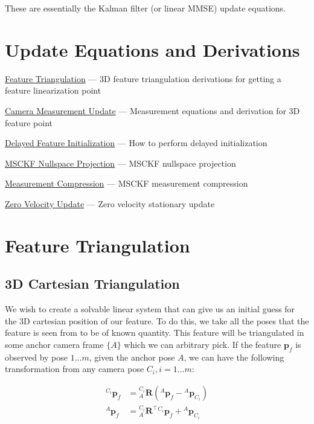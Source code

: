 These are essentially the Kalman filter (or linear M\+M\+SE) update equations.\hypertarget{update_update-examples}{}\section{Update Equations and Derivations}\label{update_update-examples}

\begin{DoxyItemize}
\item \hyperlink{update-featinit}{Feature Triangulation} --- 3D feature triangulation derivations for getting a feature linearization point
\item \hyperlink{update-feat}{Camera Measurement Update} --- Measurement equations and derivation for 3D feature point
\item \hyperlink{update-delay}{Delayed Feature Initialization} --- How to perform delayed initialization
\item \hyperlink{update-null}{M\+S\+C\+KF Nullspace Projection} --- M\+S\+C\+KF nullspace projection
\item \hyperlink{update-compress}{Measurement Compression} --- M\+S\+C\+KF measurement compression
\item \hyperlink{update-zerovelocity}{Zero Velocity Update} --- Zero velocity stationary update 
\end{DoxyItemize}\hypertarget{update-featinit}{}\section{Feature Triangulation}\label{update-featinit}
\hypertarget{update-featinit_featinit-linear}{}\subsection{3\+D Cartesian Triangulation}\label{update-featinit_featinit-linear}
We wish to create a solvable linear system that can give us an initial guess for the 3D cartesian position of our feature. To do this, we take all the poses that the feature is seen from to be of known quantity. This feature will be triangulated in some anchor camera frame $\{A\}$ which we can arbitrary pick. If the feature $\mathbf{p}_f$ is observed by pose $1\ldots m$, given the anchor pose $A$, we can have the following transformation from any camera pose $C_i, i=1\ldots m$\+:

\begin{align*} {}^{C_i}\mathbf{p}_{f} & = {}^{C_i}_A\mathbf{R} \left( {}^A\mathbf{p}_f - {}^A\mathbf{p}_{C_i}\right) \\ {}^A\mathbf{p}_f & = {}^{C_i}_A\mathbf{R}^\top {}^{C_i}\mathbf{p}_{f} + {}^A\mathbf{p}_{C_i} \end{align*}

